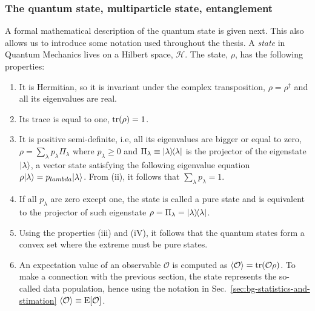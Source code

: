 \subsubsection{The quantum state, multiparticle state, entanglement}

A formal mathematical description of the quantum state is given next.
This also allows us to introduce some notation used throughout the thesis.
A \emph{state} in Quantum Mechanics lives on a Hilbert space, $\mathcal{H}$.
The state, $\rho$, has the following properties:
\begin{enumerate}
  \item
  It is Hermitian, so it is invariant under the complex transposition, $\rho=\rho^\dagger$ and all its eigenvalues are real.
  \item Its trace is equal to one, $\operatorname{tr}(\rho)=1$.
  \item It is positive semi-definite, i.e, all its eigenvalues are bigger or equal to zero, $\rho=\sum_{\lambda}p_\lambda \Pi_\lambda$ where $p_\lambda\geq 0$ and $\Pi_\lambda\equiv\vert \lambda \rangle \! \langle \lambda \vert$ is the projector of the eigenstate $\vert \lambda \rangle$, a vector state satisfying the following eigenvalue equation $\rho\vert \lambda \rangle=p_{lambda}\vert \lambda \rangle$.
  From (ii), it follows that $\sum_\lambda p_\lambda = 1$.
  \item If all $p_\lambda$ are zero except one, the state is called a pure state and is equivalent to the projector of such eigenstate $\rho=\Pi_\lambda=\vert \lambda \rangle \! \langle \lambda \vert$.
  \item Using the properties (iii) and (iV), it follows that the quantum states form a convex set where the extreme must be pure states.
  \item An expectation value of an observable $\mathcal{O}$ is computed as $\langle \mathcal{O} \rangle=\operatorname{tr}(\mathcal{O}\rho)$.
  To make a connection with the previous section, the state represents the so-called data population, hence using the notation in Sec.~\ref{sec:bg-statistics-and-stimation} $\langle \mathcal{O} \rangle\equiv\text{E}[\mathcal{O}]$.
\end{enumerate}

